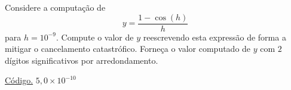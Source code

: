 \begin{exer}\label{exer:cancela_1}
  Considere a computação de
  \begin{equation}
    y = \frac{1 - \cos(h)}{h}
  \end{equation}
para $h=10^{-9}$. Compute o valor de $y$ reescrevendo esta expressão de forma a mitigar o cancelamento catastrófico. Forneça o valor computado de $y$ com $2$ dígitos significativos por arredondamento.
\end{exer}
\begin{resp}
  \ifisoctave 
  \href{https://github.com/phkonzen/notas/blob/master/src/MatematicaNumerica/cap_aritm/dados/exer_cancela_1/exer_cancela_1.m}{Código.} 
  \fi
  $5,0\times 10^{-10}$
\end{resp}
